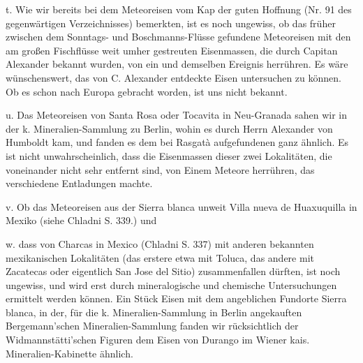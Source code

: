 \documentclass[a4paper, 11pt, oneside, polutonikogreek, german]{article}
\begin{document}
t. Wie wir bereits bei dem Meteoreisen vom Kap der guten Hoffnung (Nr. 91 des gegenwärtigen Verzeichnisses) bemerkten, ist es noch ungewiss, ob das früher zwischen dem Sonntags- und Boschmanns-Flüsse gefundene Meteoreisen mit den am großen Fischflüsse weit umher gestreuten Eisenmassen, die durch Capitan Alexander bekannt wurden, von ein und demselben Ereignis herrühren. Es wäre wünschenswert, das von C. Alexander entdeckte Eisen untersuchen zu können. Ob es schon nach Europa gebracht worden, ist uns nicht bekannt.

u. Das Meteoreisen von Santa Rosa oder Tocavita in Neu-Granada sahen wir in der k. Mineralien-Sammlung zu Berlin, wohin es durch Herrn Alexander von Humboldt kam, und fanden es dem bei Rasgatà aufgefundenen ganz ähnlich. Es ist nicht unwahrscheinlich, dass die Eisenmassen dieser zwei Lokalitäten, die voneinander nicht sehr entfernt sind, von Einem Meteore herrühren, das verschiedene Entladungen machte.

v. Ob das Meteoreisen aus der Sierra blanca unweit Villa nueva de Huaxuquilla in Mexiko (siehe Chladni S. 339.) und

w. dass von Charcas in Mexico (Chladni S. 337) mit anderen bekannten mexikanischen Lokalitäten (das erstere etwa mit Toluca, das andere mit Zacatecas oder eigentlich San Jose del Sitio) zusammenfallen dürften, ist noch ungewiss, und wird erst durch mineralogische und chemische Untersuchungen ermittelt werden können. Ein Stück Eisen mit dem angeblichen Fundorte Sierra blanca, in der, für die k. Mineralien-Sammlung in Berlin angekauften Bergemann'schen Mineralien-Sammlung fanden wir rücksichtlich der Widmannstätti'schen Figuren dem Eisen von Durango im Wiener kais. Mineralien-Kabinette ähnlich.
\clearpage
\end{document}

